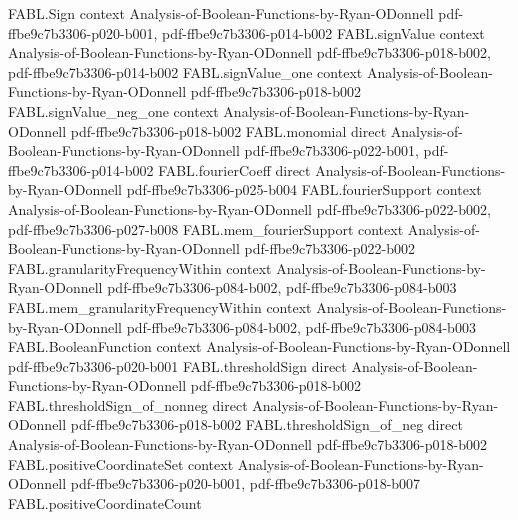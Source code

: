 \begin{theorem}
\label{FABL.laplacian_eq_card_mul_sub_expect_flip}
\leanok
{}
\proofstep
  {FABL.Sign}
  {context}
  {Analysis-of-Boolean-Functions-by-Ryan-ODonnell}
  {pdf-ffbe9c7b3306-p020-b001,
    pdf-ffbe9c7b3306-p014-b002}
\proofstep
  {FABL.signValue}
  {context}
  {Analysis-of-Boolean-Functions-by-Ryan-ODonnell}
  {pdf-ffbe9c7b3306-p018-b002,
    pdf-ffbe9c7b3306-p014-b002}
\proofstep
  {FABL.signValue_one}
  {context}
  {Analysis-of-Boolean-Functions-by-Ryan-ODonnell}
  {pdf-ffbe9c7b3306-p018-b002}
\proofstep
  {FABL.signValue_neg_one}
  {context}
  {Analysis-of-Boolean-Functions-by-Ryan-ODonnell}
  {pdf-ffbe9c7b3306-p018-b002}
\proofstep
  {FABL.monomial}
  {direct}
  {Analysis-of-Boolean-Functions-by-Ryan-ODonnell}
  {pdf-ffbe9c7b3306-p022-b001,
    pdf-ffbe9c7b3306-p014-b002}
\proofstep
  {FABL.fourierCoeff}
  {direct}
  {Analysis-of-Boolean-Functions-by-Ryan-ODonnell}
  {pdf-ffbe9c7b3306-p025-b004}
\proofstep
  {FABL.fourierSupport}
  {context}
  {Analysis-of-Boolean-Functions-by-Ryan-ODonnell}
  {pdf-ffbe9c7b3306-p022-b002,
    pdf-ffbe9c7b3306-p027-b008}
\proofstep
  {FABL.mem_fourierSupport}
  {context}
  {Analysis-of-Boolean-Functions-by-Ryan-ODonnell}
  {pdf-ffbe9c7b3306-p022-b002}
\proofstep
  {FABL.granularityFrequencyWithin}
  {context}
  {Analysis-of-Boolean-Functions-by-Ryan-ODonnell}
  {pdf-ffbe9c7b3306-p084-b002,
    pdf-ffbe9c7b3306-p084-b003}
\proofstep
  {FABL.mem_granularityFrequencyWithin}
  {context}
  {Analysis-of-Boolean-Functions-by-Ryan-ODonnell}
  {pdf-ffbe9c7b3306-p084-b002,
    pdf-ffbe9c7b3306-p084-b003}
\proofstep
  {FABL.BooleanFunction}
  {context}
  {Analysis-of-Boolean-Functions-by-Ryan-ODonnell}
  {pdf-ffbe9c7b3306-p020-b001}
\proofstep
  {FABL.thresholdSign}
  {direct}
  {Analysis-of-Boolean-Functions-by-Ryan-ODonnell}
  {pdf-ffbe9c7b3306-p018-b002}
\proofstep
  {FABL.thresholdSign_of_nonneg}
  {direct}
  {Analysis-of-Boolean-Functions-by-Ryan-ODonnell}
  {pdf-ffbe9c7b3306-p018-b002}
\proofstep
  {FABL.thresholdSign_of_neg}
  {direct}
  {Analysis-of-Boolean-Functions-by-Ryan-ODonnell}
  {pdf-ffbe9c7b3306-p018-b002}
\proofstep
  {FABL.positiveCoordinateSet}
  {context}
  {Analysis-of-Boolean-Functions-by-Ryan-ODonnell}
  {pdf-ffbe9c7b3306-p020-b001,
    pdf-ffbe9c7b3306-p018-b007}
\proofstep
  {FABL.positiveCoordinateCount}

\end{theorem}
